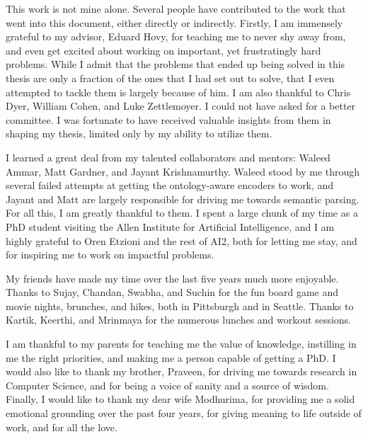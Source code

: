 This work is not mine alone. Several people have contributed to the work that
went into this document, either directly or indirectly.
Firstly, I am immensely grateful to my advisor, Eduard Hovy, for teaching me
to never shy away from, and even get excited about working on important, yet frustratingly hard problems. While I admit that the problems that ended up being solved
in this thesis are only a fraction of the ones that I had set out to solve, that I even
attempted to tackle them is largely because of him. I am also thankful to Chris Dyer,
William Cohen, and Luke Zettlemoyer. I could not have asked for a better committee. I was fortunate to have received valuable insights from them in shaping my
thesis, limited only by my ability to utilize them.

I learned a great deal from my talented collaborators and mentors: Waleed Ammar,
Matt Gardner, and Jayant Krishnamurthy. Waleed stood by me through several failed
attempts at getting the ontology-aware encoders to work, and Jayant and Matt are
largely responsible for driving me towards semantic parsing. For all this, I am greatly
thankful to them. I spent a large chunk of my time as a PhD student visiting the Allen
Institute for Artificial Intelligence, and I am highly grateful to Oren Etzioni and the
rest of AI2, both for letting me stay, and for inspiring me to work on impactful
problems.

My friends have made my time over the last five years much more enjoyable.
Thanks to Sujay, Chandan, Swabha, and Suchin for the fun board game and movie
nights, brunches, and hikes, both in Pittsburgh and in Seattle. Thanks to Kartik,
Keerthi, and Mrinmaya for the numerous lunches and workout sessions.

I am thankful to my parents for teaching me the value of knowledge, instilling
in me the right priorities, and making me a person capable of getting a PhD. I would
also like to thank my brother, Praveen, for driving me towards research in Computer
Science, and for being a voice of sanity and a source of wisdom. Finally, I would
like to thank my dear wife Modhurima, for providing me a solid emotional grounding
over the past four years, for giving meaning to life outside of work, and for all the
love.
